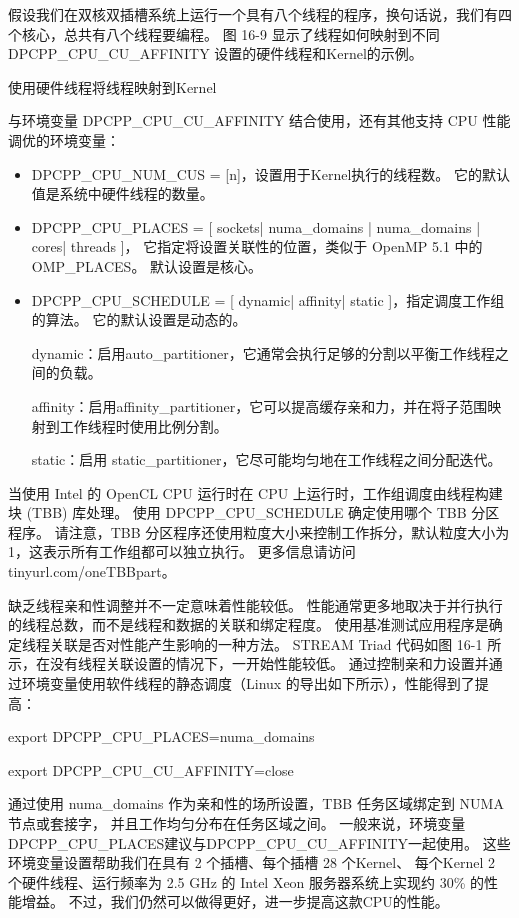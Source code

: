 假设我们在双核双插槽系统上运行一个具有八个线程的程序，换句话说，我们有四个核心，总共有八个线程要编程。 
图 16-9 显示了线程如何映射到不同 DPCPP\_CPU\_CU\_AFFINITY 设置的硬件线程和Kernel的示例。

{\color{red} 使用硬件线程将线程映射到Kernel}

与环境变量 DPCPP\_CPU\_CU\_AFFINITY 结合使用，还有其他支持 CPU 性能调优的环境变量：

\begin{itemize}
	\item DPCPP\_CPU\_NUM\_CUS = [n]，设置用于Kernel执行的线程数。 它的默认值是系统中硬件线程的数量。

	\item DPCPP\_CPU\_PLACES = [ sockets| numa\_domains | numa\_domains | cores| threads ]，
	它指定将设置关联性的位置，类似于 OpenMP 5.1 中的 OMP\_PLACES。 默认设置是核心。

	\item DPCPP\_CPU\_SCHEDULE = [ dynamic| affinity| static ]，指定调度工作组的算法。 
	它的默认设置是动态的。
	
	dynamic：启用auto\_partitioner，它通常会执行足够的分割以平衡工作线程之间的负载。

	affinity：启用affinity\_partitioner，它可以提高缓存亲和力，并在将子范围映射到工作线程时使用比例分割。

	static：启用 static\_partitioner，它尽可能均匀地在工作线程之间分配迭代。
\end{itemize}


当使用 Intel 的 OpenCL CPU 运行时在 CPU 上运行时，工作组调度由线程构建块 (TBB) 库处理。 
使用 DPCPP\_CPU\_SCHEDULE 确定使用哪个 TBB 分区程序。 
请注意，TBB 分区程序还使用粒度大小来控制工作拆分，默认粒度大小为 1，这表示所有工作组都可以独立执行。 
更多信息请访问tinyurl.com/oneTBBpart。

缺乏线程亲和性调整并不一定意味着性能较低。 
性能通常更多地取决于并行执行的线程总数，而不是线程和数据的关联和绑定程度。 
使用基准测试应用程序是确定线程关联是否对性能产生影响的一种方法。 
STREAM Triad 代码如图 16-1 所示，在没有线程关联设置的情况下，一开始性能较低。 
通过控制亲和力设置并通过环境变量使用软件线程的静态调度（Linux 的导出如下所示），性能得到了提高：

export DPCPP\_CPU\_PLACES=numa\_domains 

export DPCPP\_CPU\_CU\_AFFINITY=close

通过使用 numa\_domains 作为亲和性的场所设置，TBB 任务区域绑定到 NUMA 节点或套接字，
并且工作均匀分布在任务区域之间。 
一般来说，环境变量DPCPP\_CPU\_PLACES建议与DPCPP\_CPU\_CU\_AFFINITY一起使用。 
这些环境变量设置帮助我们在具有 2 个插槽、每个插槽 28 个Kernel、
每个Kernel 2 个硬件线程、运行频率为 2.5 GHz 的 Intel Xeon 服务器系统上实现约 30\% 的性能增益。 
不过，我们仍然可以做得更好，进一步提高这款CPU的性能。

